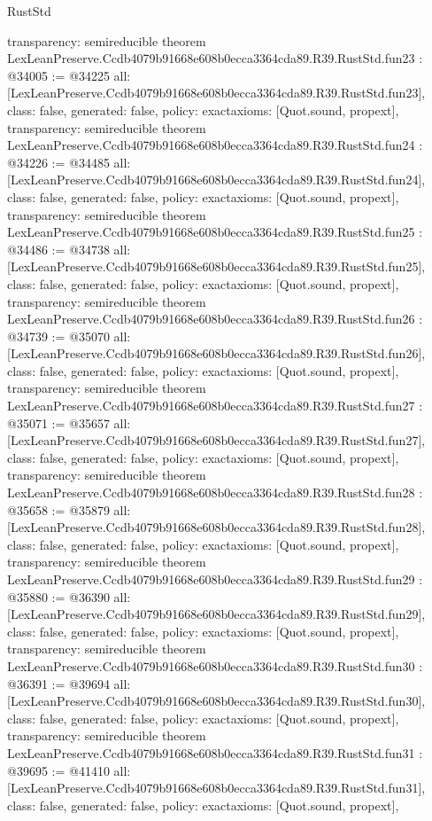 \begin{lexlean}{RustStd}
\begin{coremodule}
{  transparency: semireducible
}
theorem LexLeanPreserve.Ccdb4079b91668e608b0ecca3364cda89.R39.RustStd.fun23 : @34005 := @34225 {
  all: [LexLeanPreserve.Ccdb4079b91668e608b0ecca3364cda89.R39.RustStd.fun23],
  class: false,
  generated: false,
  policy: exact{axioms: [Quot.sound, propext]},
  transparency: semireducible
}
theorem LexLeanPreserve.Ccdb4079b91668e608b0ecca3364cda89.R39.RustStd.fun24 : @34226 := @34485 {
  all: [LexLeanPreserve.Ccdb4079b91668e608b0ecca3364cda89.R39.RustStd.fun24],
  class: false,
  generated: false,
  policy: exact{axioms: [Quot.sound, propext]},
  transparency: semireducible
}
theorem LexLeanPreserve.Ccdb4079b91668e608b0ecca3364cda89.R39.RustStd.fun25 : @34486 := @34738 {
  all: [LexLeanPreserve.Ccdb4079b91668e608b0ecca3364cda89.R39.RustStd.fun25],
  class: false,
  generated: false,
  policy: exact{axioms: [Quot.sound, propext]},
  transparency: semireducible
}
theorem LexLeanPreserve.Ccdb4079b91668e608b0ecca3364cda89.R39.RustStd.fun26 : @34739 := @35070 {
  all: [LexLeanPreserve.Ccdb4079b91668e608b0ecca3364cda89.R39.RustStd.fun26],
  class: false,
  generated: false,
  policy: exact{axioms: [Quot.sound, propext]},
  transparency: semireducible
}
theorem LexLeanPreserve.Ccdb4079b91668e608b0ecca3364cda89.R39.RustStd.fun27 : @35071 := @35657 {
  all: [LexLeanPreserve.Ccdb4079b91668e608b0ecca3364cda89.R39.RustStd.fun27],
  class: false,
  generated: false,
  policy: exact{axioms: [Quot.sound, propext]},
  transparency: semireducible
}
theorem LexLeanPreserve.Ccdb4079b91668e608b0ecca3364cda89.R39.RustStd.fun28 : @35658 := @35879 {
  all: [LexLeanPreserve.Ccdb4079b91668e608b0ecca3364cda89.R39.RustStd.fun28],
  class: false,
  generated: false,
  policy: exact{axioms: [Quot.sound, propext]},
  transparency: semireducible
}
theorem LexLeanPreserve.Ccdb4079b91668e608b0ecca3364cda89.R39.RustStd.fun29 : @35880 := @36390 {
  all: [LexLeanPreserve.Ccdb4079b91668e608b0ecca3364cda89.R39.RustStd.fun29],
  class: false,
  generated: false,
  policy: exact{axioms: [Quot.sound, propext]},
  transparency: semireducible
}
theorem LexLeanPreserve.Ccdb4079b91668e608b0ecca3364cda89.R39.RustStd.fun30 : @36391 := @39694 {
  all: [LexLeanPreserve.Ccdb4079b91668e608b0ecca3364cda89.R39.RustStd.fun30],
  class: false,
  generated: false,
  policy: exact{axioms: [Quot.sound, propext]},
  transparency: semireducible
}
theorem LexLeanPreserve.Ccdb4079b91668e608b0ecca3364cda89.R39.RustStd.fun31 : @39695 := @41410 {
  all: [LexLeanPreserve.Ccdb4079b91668e608b0ecca3364cda89.R39.RustStd.fun31],
  class: false,
  generated: false,
  policy: exact{axioms: [Quot.sound, propext]},
}
\end{coremodule}
\end{lexlean}
